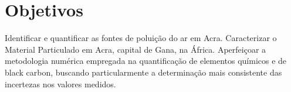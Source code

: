 \section{Objetivos}

Identificar e quantificar as fontes de poluição do ar em Acra.
Caracterizar o Material Particulado em Acra, capital de Gana, na África.
Aperfeiçoar a metodologia numérica empregada na quantificação de elementos 
químicos e de black carbon, buscando particularmente a determinação mais
consistente das incertezas nos valores medidos.


